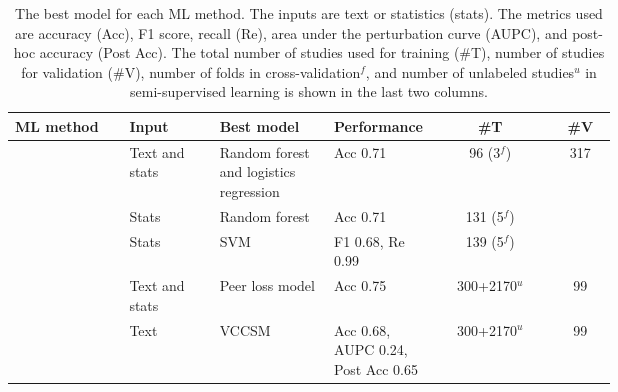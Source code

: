 \documentclass[12pt, a4paper, twocolumn]{article}
\begin{document}
	\begin{table}[ht]
		\centering
		\caption[Performance Table]{The best model for each ML method. The inputs are text or statistics (stats). The metrics used are accuracy (Acc), F1 score, recall (Re), area under the perturbation curve (AUPC), and post-hoc accuracy (Post Acc). The total number of studies used for training (\#T), number of studies for validation (\#V), number of folds in cross-validation$^{f}$, and number of unlabeled studies$^{u}$ in semi-supervised learning is shown in the last two columns.}\label{tab:performance_table}
		\begin{tabular}{>{\raggedright\arraybackslash}p{0.19\linewidth} >{\raggedright\arraybackslash}p{0.15\linewidth} >{\raggedright\arraybackslash}p{0.19\linewidth} >{\raggedright\arraybackslash}p{0.17\linewidth}  c c}  
		\hline
		ML method                     & Input               & Best model                             & Performance                                           &  \#T  & \#V       \\ \hline

		\citet{Yang2020estimating}    				& Text and stats 	& Random forest and logistics regression & Acc 0.71                    & 96 (3$^{f}$)   & 317 \\ 
		\citet{Altmejd2019predicting} 		& Stats          	& Random forest                          & Acc 0.71                                            & 131 (5$^{f}$)     &    \\ 
		\citet{wu2021predicting}     			& Stats          	& SVM                                    & F1 0.68, Re 0.99                                & 139 (5$^{f}$)   &  \\ 
		\citet{luo2020research}       				& Text and stats 	& Peer loss model                        & Acc 0.75                                       & 300+2170$^{u}$	& 99   \\ 
		\citet{Luo2022sentence}     				& Text		& VCCSM                                       & Acc 0.68, AUPC 0.24, Post Acc 0.65 & 300+2170$^{u}$	& 99\\ \hline                                      
		\end{tabular}				
	\end{table}
\end{document}
